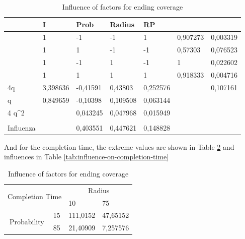 \begin{table}[h!]
\centering
\begin{tabular}{|l|l|l|l|l|l|l|}
\hline
                       & I        & Prob     & Radius   & RP       &          &          \\ \hline
                       & 1        & -1       & -1       & 1        & 0,907273 & 0,003319 \\ \hline
                       & 1        & 1        & -1       & -1       & 0,57303  & 0,076523 \\ \hline
                       & 1        & -1       & 1        & -1       & 1        & 0,022602 \\ \hline
                       & 1        & 1        & 1        & 1        & 0,918333 & 0,004716 \\ \hline
4q                     & 3,398636 & -0,41591 & 0,43803  & 0,252576 &          & 0,107161 \\ \hline
q                      & 0,849659 & -0,10398 & 0,109508 & 0,063144 &          &          \\ \hline
4 q\textasciicircum{}2 &          & 0,043245 & 0,047968 & 0,015949 &          &          \\ \hline
                       &          &          &          &          &          &          \\ \hline
Influenza              &          & 0,403551 & 0,447621 & 0,148828 &          &          \\ \hline
\end{tabular}
\caption{Influence of factors for ending coverage}
\label{tab:influence-on-end-coverage}
\end{table}

And for the completion time, the extreme values are shown in Table \ref{tab:extreme-factors-on-completion-time} and influences in Table \ref{tab:influence-on-completion-time}

\begin{table}[h!]
\centering
\begin{tabular}{|cl|rr|}
\hline
\multicolumn{2}{|c|}{\multirow{2}{*}{Completion Time}}  & \multicolumn{2}{c|}{Radius}                             \\ \cline{3-4} 
\multicolumn{2}{|c|}{}                                  & \multicolumn{1}{l|}{10}       & \multicolumn{1}{l|}{75} \\ \hline
\multicolumn{1}{|c|}{\multirow{2}{*}{Probability}} & 15 & \multicolumn{1}{r|}{111,0152} & 47,65152                \\ \cline{2-4} 
\multicolumn{1}{|c|}{}                             & 85 & \multicolumn{1}{r|}{21,40909} & 7,257576                \\ \hline
\end{tabular}
\caption{Influence of factors for ending coverage}
\label{tab:extreme-factors-on-completion-time}
\end{table}

